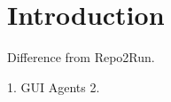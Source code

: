 
\section{Introduction}














Difference from Repo2Run.\cite{Bonatti2024WindowsAA}

1. GUI Agents
2. 
